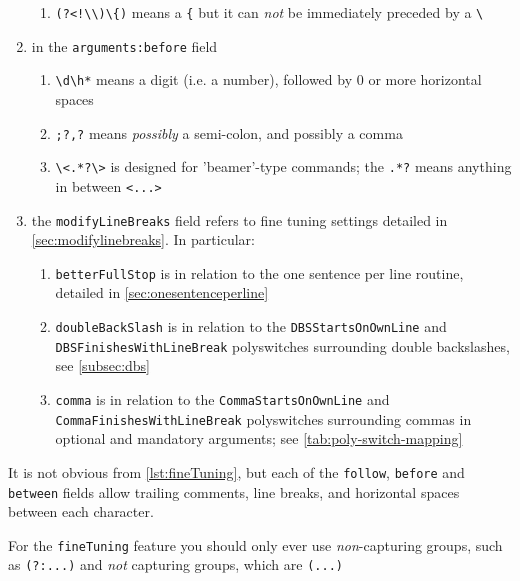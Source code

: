 \begin{enumerate}
\begin{enumerate}
         \item \lstinline^(?<!\\)\{)^ means a \lstinline^{^ but it can \emph{not} be immediately preceded by a \lstinline!\!
        \end{enumerate}
  \item in the \texttt{arguments:before} field
        \begin{enumerate}
         \item \lstinline^\d\h*^ means a digit (i.e. a number), followed by 0 or more horizontal spaces
         \item \lstinline^;?,?^ means \emph{possibly} a semi-colon, and possibly a comma
         \item \lstinline^\<.*?\>^ is designed for 'beamer'-type commands; the
               \lstinline^.*?^ means anything in between \lstinline^<...>^
        \end{enumerate}
  \item the \texttt{modifyLineBreaks} field refers to fine tuning settings detailed in
        \vref{sec:modifylinebreaks}. In particular:
        \begin{enumerate}
         \item \texttt{betterFullStop} is in relation to the one sentence per line routine, detailed in
               \vref{sec:onesentenceperline}
         \item \texttt{doubleBackSlash} is in relation to the \texttt{DBSStartsOnOwnLine} and
               \texttt{DBSFinishesWithLineBreak} polyswitches surrounding double backslashes, see
               \vref{subsec:dbs}
         \item \texttt{comma} is in relation to the \texttt{CommaStartsOnOwnLine} and
               \texttt{CommaFinishesWithLineBreak} polyswitches surrounding commas in optional and
               mandatory arguments; see \vref{tab:poly-switch-mapping}
        \end{enumerate}
 \end{enumerate}

 It is not obvious from \cref{lst:fineTuning}, but each of the \texttt{follow},
 \texttt{before} and \texttt{between} fields allow trailing comments, line breaks, and
 horizontal spaces between each character.

 \begin{warning}
  For the \texttt{fineTuning} feature you should only ever use \emph{non}-capturing
  groups, such as \lstinline!(?:...)! and \emph{not} capturing groups, which are
  \lstinline!(...)!
 \end{warning}


